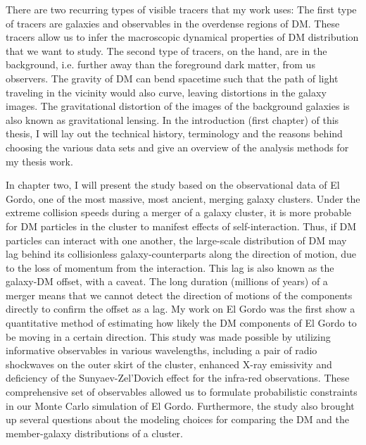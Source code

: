 \documentclass[ucdthesis.tex]{subfiles}
\begin{document}
		There are two recurring types of visible tracers that 
		my work uses: The first type of tracers are galaxies and observables in the 
		 overdense regions of DM. These tracers allow 
		us to infer the macroscopic dynamical properties of DM distribution that we want to study. The
		second type of tracers, on the hand, are in the background, i.e.
		further away than the foreground dark matter, from us observers. The
		gravity of DM can bend spacetime such that the path of light traveling in 
		the vicinity would also curve, leaving distortions in the galaxy images. 
		The gravitational distortion of the images 
		of the background galaxies is also known as gravitational lensing. In the
		introduction (first chapter) of this thesis, I will lay out the technical
		history, terminology and the reasons behind choosing the various data sets
		and give an overview of the analysis methods for my thesis work. 
		
			In chapter two, I will present the study based on the observational data 
			of El Gordo, one of the most massive, most ancient, merging galaxy clusters. 
		Under the extreme collision speeds during a merger of a galaxy cluster, 
		it is more probable for DM particles in the cluster to manifest effects of
		self-interaction. Thus, if DM particles can interact with one another, 		
		the large-scale distribution of DM may lag behind
		its collisionless galaxy-counterparts along the direction of motion, due to
		the loss of momentum from the interaction. This
		lag is also known as the galaxy-DM offset, with a caveat. The long duration 
		(millions of years) 
		of a merger means that we cannot detect the
		direction of motions of the components directly to confirm the offset as
		a lag. My work on El Gordo was the first show a quantitative method of estimating
		how likely the DM components of El Gordo to be moving in a certain
		direction.	This study was made possible by utilizing informative
		observables in various wavelengths, including a pair of radio shockwaves on
		the outer skirt of the cluster, enhanced X-ray emissivity and deficiency of the
		Sunyaev-Zel'Dovich effect for the infra-red observations.
		These comprehensive set of observables allowed us to formulate 
		probabilistic constraints in our Monte Carlo simulation of El Gordo.
		Furthermore, the study also brought up several questions about the modeling
		choices for comparing the DM and the member-galaxy distributions of a cluster.
		
\end{document}
